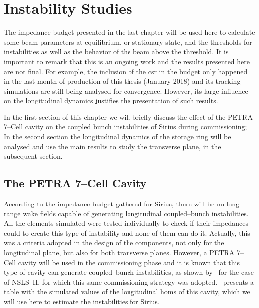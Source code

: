 \chapter{Instability Studies}\label{cap:instability_studies}

    The impedance budget presented in the last chapter will be used here to calculate some beam parameters at equilibrium, or stationary state, and the thresholds for instabilities as well as the behavior of the beam above the threshold. It is important to remark that this is an ongoing work and the results presented here are not final. For example, the inclusion of the \gls{csr} in the budget only happened in the last month of production of this thesis (January 2018) and its tracking simulations are still being analysed for convergence. However, its large influence on the longitudinal dynamics justifies the presentation of such results.

    In the first section of this chapter we will briefly discuss the effect of the PETRA 7--Cell cavity on the coupled bunch instabilities of Sirius during commissioning; In the second section the longitudinal dynamics of the storage ring will be analysed and use the main results to study the transverse plane, in the subsequent section.

\section{The PETRA 7--Cell Cavity}

    According to the impedance budget gathered for Sirius, there will be no long--range wake fields capable of generating longitudinal coupled--bunch instabilities. All the elements simulated were tested individually to check if their impedances could to create this type of instability and none of them can do it. Actually, this was a criteria adopted in the design of the components, not only for the longitudinal plane, but also for both transverse planes. However, a PETRA 7--Cell cavity will be used in the commissioning phase and it is known that this type of cavity can generate coupled--bunch instabilities, as shown by~ for the case of NSLS--II, for which this same commissioning strategy was adopted.~ presents a table with the simulated values of the longitudinal \glspl{hom} of this cavity, which we will use here to estimate the instabilities for Sirius.

